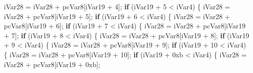 \documentclass[
]{article}
\newenvironment{Shaded}{}{}
\newcommand{\BaseNTok}[1]{\textcolor[rgb]{0.25,0.63,0.44}{#1}}
\newcommand{\ControlFlowTok}[1]{\textcolor[rgb]{0.00,0.44,0.13}{\textbf{#1}}}
\newcommand{\DecValTok}[1]{\textcolor[rgb]{0.25,0.63,0.44}{#1}}
\newcommand{\NormalTok}[1]{#1}
\newcommand{\OperatorTok}[1]{\textcolor[rgb]{0.40,0.40,0.40}{#1}}
\begin{document}
\begin{Shaded}
\begin{Highlighting}[]
\NormalTok{            iVar28 }\OperatorTok{=}\NormalTok{ iVar28 }\OperatorTok{+}\NormalTok{ pcVar8}\OperatorTok{[}\NormalTok{iVar19 }\OperatorTok{+} \DecValTok{4}\OperatorTok{];}
            \ControlFlowTok{if} \OperatorTok{(}\NormalTok{iVar19 }\OperatorTok{+} \DecValTok{5} \OperatorTok{\textless{}}\NormalTok{ iVar4}\OperatorTok{)} \OperatorTok{\{}
\NormalTok{              iVar28 }\OperatorTok{=}\NormalTok{ iVar28 }\OperatorTok{+}\NormalTok{ pcVar8}\OperatorTok{[}\NormalTok{iVar19 }\OperatorTok{+} \DecValTok{5}\OperatorTok{];}
              \ControlFlowTok{if} \OperatorTok{(}\NormalTok{iVar19 }\OperatorTok{+} \DecValTok{6} \OperatorTok{\textless{}}\NormalTok{ iVar4}\OperatorTok{)} \OperatorTok{\{}
\NormalTok{                iVar28 }\OperatorTok{=}\NormalTok{ iVar28 }\OperatorTok{+}\NormalTok{ pcVar8}\OperatorTok{[}\NormalTok{iVar19 }\OperatorTok{+} \DecValTok{6}\OperatorTok{];}
                \ControlFlowTok{if} \OperatorTok{(}\NormalTok{iVar19 }\OperatorTok{+} \DecValTok{7} \OperatorTok{\textless{}}\NormalTok{ iVar4}\OperatorTok{)} \OperatorTok{\{}
\NormalTok{                  iVar28 }\OperatorTok{=}\NormalTok{ iVar28 }\OperatorTok{+}\NormalTok{ pcVar8}\OperatorTok{[}\NormalTok{iVar19 }\OperatorTok{+} \DecValTok{7}\OperatorTok{];}
                  \ControlFlowTok{if} \OperatorTok{(}\NormalTok{iVar19 }\OperatorTok{+} \DecValTok{8} \OperatorTok{\textless{}}\NormalTok{ iVar4}\OperatorTok{)} \OperatorTok{\{}
\NormalTok{                    iVar28 }\OperatorTok{=}\NormalTok{ iVar28 }\OperatorTok{+}\NormalTok{ pcVar8}\OperatorTok{[}\NormalTok{iVar19 }\OperatorTok{+} \DecValTok{8}\OperatorTok{];}
                    \ControlFlowTok{if} \OperatorTok{(}\NormalTok{iVar19 }\OperatorTok{+} \DecValTok{9} \OperatorTok{\textless{}}\NormalTok{ iVar4}\OperatorTok{)} \OperatorTok{\{}
\NormalTok{                      iVar28 }\OperatorTok{=}\NormalTok{ iVar28 }\OperatorTok{+}\NormalTok{ pcVar8}\OperatorTok{[}\NormalTok{iVar19 }\OperatorTok{+} \DecValTok{9}\OperatorTok{];}
                      \ControlFlowTok{if} \OperatorTok{(}\NormalTok{iVar19 }\OperatorTok{+} \DecValTok{10} \OperatorTok{\textless{}}\NormalTok{ iVar4}\OperatorTok{)} \OperatorTok{\{}
\NormalTok{                        iVar28 }\OperatorTok{=}\NormalTok{ iVar28 }\OperatorTok{+}\NormalTok{ pcVar8}\OperatorTok{[}\NormalTok{iVar19 }\OperatorTok{+} \DecValTok{10}\OperatorTok{];}
                        \ControlFlowTok{if} \OperatorTok{(}\NormalTok{iVar19 }\OperatorTok{+} \BaseNTok{0xb} \OperatorTok{\textless{}}\NormalTok{ iVar4}\OperatorTok{)} \OperatorTok{\{}
\NormalTok{                          iVar28 }\OperatorTok{=}\NormalTok{ iVar28 }\OperatorTok{+}\NormalTok{ pcVar8}\OperatorTok{[}\NormalTok{iVar19 }\OperatorTok{+} \BaseNTok{0xb}\OperatorTok{];}

\end{Highlighting}
\end{Shaded}
\end{document}
